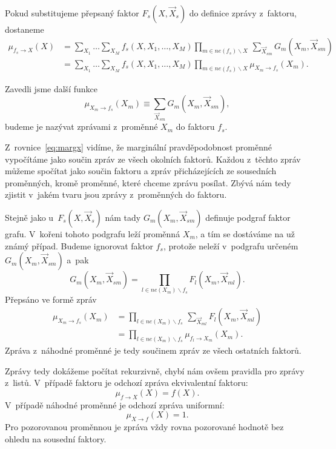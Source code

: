 Pokud substitujeme přepsaný faktor $F_s(X, \vec{X}_s)$ do definice zprávy z~faktoru, dostaneme
\begin{align}
\mu_{f_s \rightarrow X}(X) &=
    \sum_{X_1} \dots \sum_{X_M}
        f_s(X, X_1, \dots, X_M)
        \prod_{m \in ne(f_s) \backslash X}\,
            \sum_{\vec{X}_{sm}}
                G_m(X_m, \vec{X}_{sm})
\\
&= \sum_{X_1} \dots \sum_{X_M}
    f_s(X, X_1, \dots, X_M)
    \prod_{m \in ne(f_s) \backslash X}
        \mu_{X_m \rightarrow f_s}(X_m).
\label{eq:mfsx}
\end{align}

Zavedli jsme další funkce 
\begin{equation}
    \mu_{X_m \rightarrow f_s}(X_m) \equiv \sum_{\vec{X}_{sm}} G_m(X_m, \vec{X}_{sm}),
\label{eq:defmsgxf}
\end{equation}
budeme je nazývat zprávami z~proměnné $X_m$ do faktoru $f_s$.

Z~rovnice~\ref{eq:margx} vidíme, že marginální pravděpodobnost proměnné vypočítáme jako součin zpráv ze všech okolních faktorů.
Každou z~těchto zpráv můžeme spočítat jako součin faktoru a zpráv přicházejících ze sousedních proměnných, kromě proměnné, které chceme zprávu posílat. Zbývá nám tedy zjistit v~jakém tvaru jsou zprávy z~proměnných do faktoru.

Stejně jako u~$F_s(X, \vec{X}_s)$ nám tady $G_m(X_m, \vec{X}_{sm})$ definuje podgraf faktor grafu. 
V~kořeni tohoto podgrafu leží proměnná $X_m$, a tím se dostáváme na už známý případ.
Budeme ignorovat faktor $f_s$, protože neleží v~podgrafu určeném $G_m(X_m, \vec{X}_{sm})$ a~pak 
\begin{equation}
    G_m(X_m, \vec{X}_{sm}) = \prod_{l \in ne(X_m) \backslash f_s} F_l(X_m, \vec{X}_{ml}).
\end{equation}
Přepsáno ve formě zpráv
\begin{align}
\mu_{X_m \rightarrow f_s}(X_m)
&= \prod_{l \in ne(X_m) \backslash f_s}\,
    \sum_{\vec{X}_{ml}}
        F_l(X_m, \vec{X}_{ml})
\\
&= \prod_{l \in ne(X_m) \backslash f_s}
    \mu_{f_l \rightarrow X_m}(X_m).
\end{align}
Zpráva z~náhodné proměnné je tedy součinem zpráv ze všech ostatních faktorů.

Zprávy tedy dokážeme počítat rekurzivně, chybí nám ovšem pravidla pro zprávy z~listů.
V~případě faktoru je odchozí zpráva ekvivalentní faktoru:
\begin{equation}
    \mu_{f \rightarrow X}(X) = f(X).
\end{equation}
V~případě náhodné proměnné je odchozí zpráva uniformní:
\begin{equation}
    \mu_{X \rightarrow f}(X) = 1.
\end{equation}
Pro pozorovanou proměnnou je zpráva vždy rovna pozorované hodnotě bez ohledu na sousední faktory.

